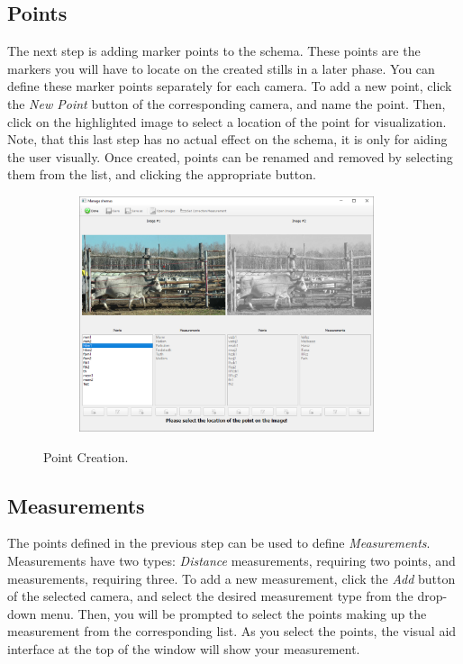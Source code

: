 \documentclass[10pt,a4paper,oneside]{report}             %
\newcommand*{\img}[1]{%
	\raisebox{-.02\baselineskip}{%
		\texttt{[image: \#1]}%
	}%
}
\begin{document}
\subsection{Points}

The next step is adding marker points to the schema. These points are the markers you will have to locate on the created stills in a later phase. You can define these marker points separately for each camera. To add a new point, click the \textit{New Point} \img{../VAM/Icons/1462036180_list-add.png} button of the corresponding camera, and name the point. Then, click on the highlighted image to select a location of the point for visualization. Note, that this last step has no actual effect on the schema, it is only for aiding the user visually. Once created, points can be renamed and removed by selecting them from the list, and clicking the appropriate button.

\begin{figure}[H]
	\centering
	\begin{subfigure}{\textwidth}
		\centering 
		\includegraphics[width=0.95\textwidth]{./images/SchemPoint.png}
	\end{subfigure}
	\caption[]
	{\small  Point Creation.}
\end{figure} 

\subsection{Measurements}

The points defined in the previous step can be used to define \textit{Measurements}. Measurements have two types: \textit{Distance} measurements, requiring two points, and  measurements, requiring three. To add a new measurement, click the \textit{Add} \img{../VAM/Icons/1462036180_list-add.png} button of the selected camera, and select the desired measurement type from the drop-down menu. Then, you will be prompted to select the points making up the measurement from the corresponding list. As you select the points, the visual aid interface at the top of the window will show your measurement. 
\end{document}
